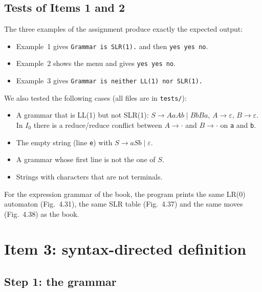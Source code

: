 \documentclass[11pt,a4paper]{article}
\newcommand{\code}[1]{\texttt{#1}}
\begin{document}
\subsection{Tests of Items 1 and 2}

The three examples of the assignment produce exactly the expected output:
\begin{itemize}
  \item Example~1 gives \code{Grammar is SLR(1).} and then \code{yes yes no}.
  \item Example~2 shows the menu and gives \code{yes yes no}.
  \item Example~3 gives \code{Grammar is neither LL(1) nor SLR(1).}
\end{itemize}
We also tested the following cases (all files are in \code{tests/}):
\begin{itemize}
  \item A grammar that is LL(1) but not SLR(1): $S \to AaAb \mid BbBa$, $A \to \varepsilon$, $B \to \varepsilon$. In $I_0$ there is a reduce/reduce conflict between $A \to \cdot$ and $B \to \cdot$ on \code{a} and \code{b}.
  \item The empty string (line \code{e}) with $S \to aSb \mid \varepsilon$.
  \item A grammar whose first line is not the one of $S$.
  \item Strings with characters that are not terminals.
\end{itemize}
For the expression grammar of the book, the program prints the same LR(0) automaton (Fig.~4.31), the
same SLR table (Fig.~4.37) and the same moves (Fig.~4.38) as the book.

\section{Item 3: syntax-directed definition}

\subsection{Step 1: the grammar}
\end{document}
